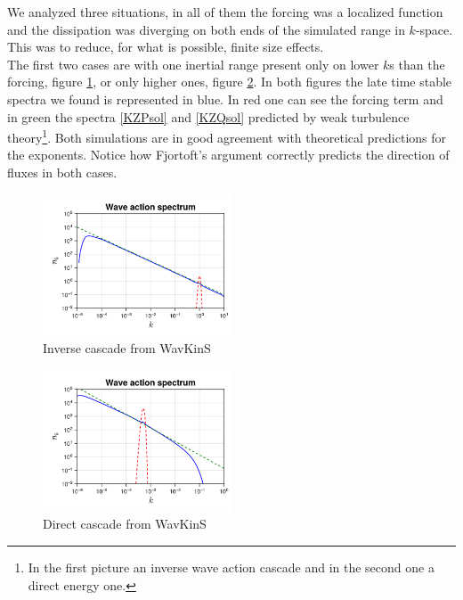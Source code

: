     We analyzed three situations, in all of them the forcing was a localized function and the dissipation was diverging on both ends of the simulated range in $k$-space. This was to reduce, for what is possible, finite size effects.\\
    The first two cases are with one inertial range present only on lower $k$s than the forcing, figure \ref{fig:cascinv}, or only higher ones, figure \ref{fig:cascdir}. In both figures the late time stable spectra we found is represented in blue. In red one can see the forcing term and in green the spectra
    \eqref{KZPsol} and \eqref{KZQsol} predicted by weak turbulence theory\footnote{In the first picture an inverse wave action cascade and in the second one a direct energy one.}. Both simulations are in good agreement with theoretical predictions for the exponents.
    Notice how Fjortoft's argument correctly predicts the direction of fluxes in both cases. 
    \begin{figure}[ht]
        \centering
            \includegraphics[width=0.5\textwidth]{images/MMT_inverse_256_[1.0e-5-10.0].png}
            \vspace{-0.5cm}
            \caption{Inverse cascade from WavKinS}
            \label{fig:cascinv}
    \end{figure}
    \begin{figure}[ht]
        \centering
            \includegraphics[width=0.5\textwidth]{images/MMT_direct_256[1.0e-6_1.0].png}
            \vspace{-0.5cm}
            \caption{Direct cascade from WavKinS}
            \label{fig:cascdir}
    \end{figure}
